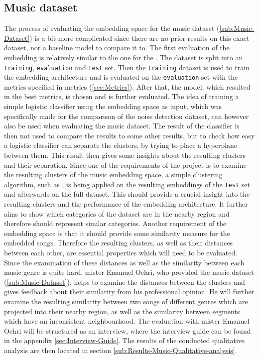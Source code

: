\subsection{Music dataset}
\label{sub:Eval-Music}
The process of evaluating the embedding space for the music dataset (\ref{sub:Music-Dataset}) is a bit more complicated since there are no prior results on this exact dataset, nor a baseline model to compare it to. The first evaluation of the embedding is relatively similar to the one for the . The dataset is split into an \texttt{training}, \texttt{evaluation} and \texttt{test} set. Then the \texttt{training} dataset is used to train the embedding architecture and is evaluated on the \texttt{evaluation} set with the metrics specified in metrics (\ref{sec:Metrics}). After that, the model, which resulted in the best metrics, is chosen and is further evaluated.
\newline
\newline
The idea of training a simple logistic classifier using the embedding space as input, which was specifically made for the comparison of the noise detection dataset, can however also be used when evaluating the music dataset. The result of the classifier is then not used to compare the results to some other results, but to check how easy a logistic classifier can separate the clusters, by trying to place a hyperplane between them. This result then gives some insights about the resulting clusters and their separation.
\newline
\newline
Since one of the requirements of the project is to examine the resulting clusters of the music embedding space, a simple clustering algorithm, such as , is being applied on the resulting embeddings of the \texttt{test} set and afterwards on the full dataset. This should provide a crucial insight into the resulting clusters and the performance of the embedding architecture. It further aims to show which categories of the dataset are in the nearby region and therefore should represent similar categories. 
\newline
\newline
Another requirement of the embedding space is that it should provide some similarity measure for the embedded songs. Therefore the resulting clusters, as well as their distances between each other, are essential properties which will need to be evaluated. Since the examination of these distances as well as the similarity between each music genre is quite hard, mister Emanuel Oehri, who provided the music dataset (\ref{sub:Music-Dataset}), helps to examine the distances between the clusters and gives feedback about their similarity from his professional opinion. He will further examine the resulting similarity between two songs of different genres which are projected into their nearby region, as well as the similarity between segments which have an inconsistent neighbourhood. The evaluation with mister Emanuel Oehri will be structured as an interview, where the interview guide can be found in the appendix \ref{sec:Interview-Guide}. The results of the conducted qualitative analysis are then located in section \ref{sub:Results-Music-Qualitative-analysis}.

